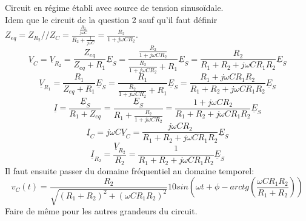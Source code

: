 {
Circuit en régime établi avec source de tension sinusoïdale.\\
Idem que le circuit de la question 2 sauf qu'il faut définir $Z_{eq}=Z_{R_2}//Z_C=\frac{\frac{R_2}{j\omega C}}{R_2+\frac{1}{j\omega C}}=\frac{R_2}{1+j\omega CR_2}$.
$$\underline{V}_C=\underline{V}_{R_2}=\frac{Z_{eq}}{Z_{eq}+R_1}\underline{E}_S=\frac{\frac{R_2}{1+j\omega CR_2}}{\frac{R_2}{1+j\omega CR_2}+R_1}\underline{E}_S=\frac{R_2}{R_1+R_2+j\omega CR_1R_2}\underline{E}_S$$
$$\underline{V}_{R_1}=\frac{R_1}{Z_{eq}+R_1}\underline{E}_S=\frac{R_1}{\frac{R_2}{1+j\omega CR_2}+R_1}\underline{E}_S=\frac{R_1+j\omega CR_1R_2}{R_1+R_2+j\omega CR_1R_2}\underline{E}_S$$
$$\underline{I}=\frac{\underline{E}_S}{R_1+Z_{eq}}=\frac{\underline{E}_S}{R_1+\frac{R_2}{1+j\omega CR_2}}=\frac{1+j\omega CR_2}{R_1+R_2+j\omega CR_1R_2}\underline{E}_S$$
$$\underline{I}_C=j\omega C\underline{V}_C=\frac{j\omega CR_2}{R_1+R_2+j\omega CR_1R_2}\underline{E}_S$$
$$\underline{I}_{R_2}=\frac{\underline{V}_{R_2}}{R_2}=\frac{1}{R_1+R_2+j\omega CR_1R_2}\underline{E}_S$$
Il faut ensuite passer du domaine fréquentiel au domaine temporel:
$$v_C(t)=\frac{R_2}{\sqrt{(R_1+R_2)^2+(\omega CR_1R_2)^2}}10sin(\omega t+\phi-arctg(\frac{\omega CR_1R_2}{R_1+R_2}))$$
Faire de même pour les autres grandeurs du circuit.
}


